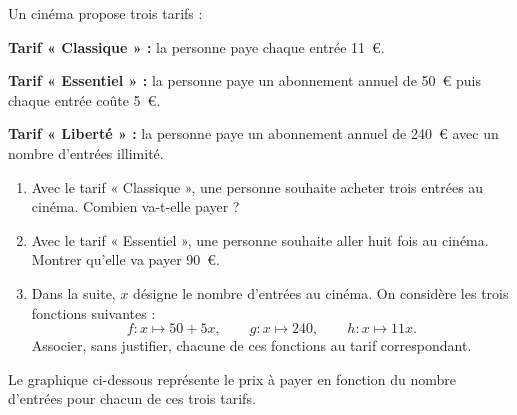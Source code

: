 \documentclass[exercice,a4]{thedocument}%
\begin{document}
%
Un cinéma propose trois tarifs :

\textbf{Tarif « Classique » :} la personne paye chaque entrée 11~\euro.

\textbf{Tarif « Essentiel » :} la personne paye un abonnement annuel de
50~\euro{} puis chaque entrée coûte 5~\euro.

\textbf{Tarif « Liberté » :} la personne paye un abonnement annuel de
240~\euro{} avec un nombre d'entrées illimité.

\begin{enumerate}
    \item Avec le tarif « Classique », une personne souhaite acheter trois
    entrées au cinéma. Combien va-t-elle payer ?
    \item Avec le tarif « Essentiel », une personne souhaite aller huit fois
    au cinéma. Montrer qu'elle va payer 90~\euro.
    \item Dans la suite, $x$ désigne le nombre d'entrées au cinéma.
    On considère les trois fonctions suivantes :
    \[
        f:x\longmapsto 50+5x,\qquad
        g:x\longmapsto 240,\qquad
        h:x\longmapsto 11x.
    \]
    Associer, sans justifier, chacune de ces fonctions au tarif correspondant.
\end{enumerate}

Le graphique ci-dessous représente le prix à payer en fonction du nombre
d'entrées pour chacun de ces trois tarifs.

\begin{center}
\end{center}
\end{document}
